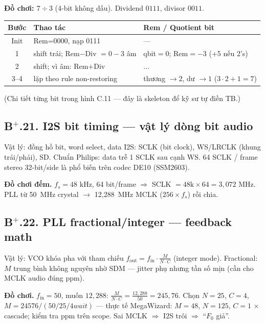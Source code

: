 \noindent\textbf{Đồ chơi: $7\div3$} (4-bit không dấu). Dividend $0111$, divisor $0011$.
\begin{center}\small
\begin{tabular}{@{}cll@{}}
\toprule
Bước & Thao tác & Rem / Quotient bit \\
\midrule
Init & Rem=0000, nạp 0111 & --- \\
1 & shift trái; Rem$-$Div $=0-3$ âm & qbit$=0$; Rem$=-3$ (+5 nếu 2's) \\
2 & shift; vì âm: Rem$+$Div & ... \\
3--4 & lặp theo rule non-restoring & thương $\to2$, dư $\to1$ ($3\cdot2+1=7$) \\
\bottomrule
\end{tabular}
\end{center}
(Chi tiết từng bit trong hình C.11 --- đây là skeleton để kỹ sư tự điền TB.)

\subsection*{B$^+$.21. I2S bit timing --- vật lý dòng bit audio}

\begin{firstprin}{Vật lý: đồng hồ bit, word select, data}
I2S: SCLK (bit clock), WS/LRCLK (khung trái/phải), SD. Chuẩn Philips: data trễ 1 SCLK sau cạnh WS. 64 SCLK / frame stereo 32-bit/side là phổ biến trên codec DE10 (SSM2603).
\end{firstprin}

\noindent\textbf{Đồ chơi đếm.} $f_s=48\text{ kHz}$, 64 bit/frame $\Rightarrow$ SCLK $=48\text{k}\times64=3{,}072\text{ MHz}$. PLL từ 50~MHz crystal $\to$ 12{,}288~MHz MCLK ($256\times f_s$) rồi chia.

\subsection*{B$^+$.22. PLL fractional/integer --- feedback math}

\begin{firstprin}{Vật lý: VCO khóa pha với tham chiếu}
$f_{\mathrm{out}}=f_{\mathrm{in}}\cdot\frac{M}{N\cdot C}$ (integer mode). Fractional: $M$ trung bình không nguyên nhờ SDM --- jitter phụ nhưng tần số mịn (cần cho MCLK audio đúng ppm).
\end{firstprin}

\noindent\textbf{Đồ chơi.} $f_{\mathrm{in}}=50$, muốn $12{,}288$: $\frac{M}{N\cdot C}=\frac{12{,}288}{50}=245{,}76$. Chọn $N=25$, $C=4$, $M=24576/(50/25/4 wait)$ --- thực tế MegaWizard: $M=48$, $N=125$, $C=1$ $\times$ cascade; kiểm tra ppm trên scope. Sai MCLK $\Rightarrow$ I2S trôi $\Rightarrow$ ``$F_0$ giả''.

